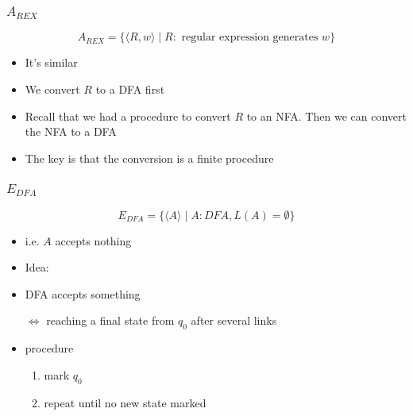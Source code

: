 \begin{frame}[allowframebreaks]
\begin{itemize}
\end{itemize}\end{frame} \begin{frame}[allowframebreaks] \frametitle{$A_{REX}$}
\begin{equation*}
  A_{REX}
=\{\langle  R,w\rangle \mid R: \mbox{ regular expression generates } w\}
\end{equation*}
  \begin{itemize}
\item It's similar
\item We convert $R$ to a DFA first
\item Recall that we had a procedure to convert $R$ to an NFA. Then we
  can convert the NFA to a DFA
\item The key is that the conversion is a \alert{finite} procedure
\end{itemize}\end{frame} \begin{frame}[allowframebreaks] \frametitle{$E_{DFA}$}
\begin{equation*}
  E_{DFA}
=\{\langle  A\rangle 
\mid A: DFA, L(A)=\emptyset\}
\end{equation*}
  \begin{itemize}
\item i.e. $A$ accepts nothing
\item Idea:

\item [] DFA accepts something

$\Leftrightarrow$ reaching a final state from $q_0$ 
after several links
\item procedure
  \begin{enumerate}
  \item mark $q_0$
  \item repeat until no new state marked


\end{enumerate}
\end{itemize}
\end{frame}
